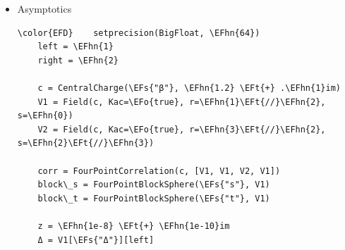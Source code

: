 \documentclass[a4paper]{article}
\numberwithin{equation}{section}
\newcommand{\EFc}[1]{\textcolor{EFc}{#1}} %
\newcommand{\EFcd}[1]{\textcolor{EFcd}{#1}} %
\newcommand{\EFs}[1]{\textcolor{EFs}{#1}} %
\newcommand{\EFt}[1]{\textcolor{EFt}{#1}} %
\newcommand{\EFo}[1]{\textcolor{EFo}{#1}} %
\newcommand{\EFhn}[1]{\textcolor{EFhn}{#1}} %
\begin{document}
\begin{itemize}
\begin{Code}
\begin{Verbatim}
    c = CentralCharge(\EFs{"β"}, big(\EFhn{1.2}\EFt{+}.\EFhn{1}\EFt{*}\EFhn{1}im));
    V1 = Field(c, \EFs{"Δ"}, \EFhn{0.23}\EFt{+}.\EFhn{11}im, diagonal=\EFo{true});
    V2 = Field(c, \EFs{"Δ"}, \EFhn{3.43}, diagonal=\EFo{true});
    V3 = Field(c, \EFs{"Δ"}, \EFhn{0.13}, diagonal=\EFo{true});
    V4 = Field(c, \EFs{"Δ"}, \EFhn{1.3}, diagonal=\EFo{true});
    V = Field(c, \EFs{"Δ"}, \EFhn{0.1}, diagonal = \EFo{true});

    corr = FourPointCorrelation(c, [V1, V2, V3, V4])

    bl\_s = FourPointBlockSphere(\EFs{"s"}, V)
    bl\_t = FourPointBlockSphere(\EFs{"t"}, V)
    bl\_u = FourPointBlockSphere(\EFs{"u"}, V)

    x=\EFhn{0.05}

    \EFcd{\#} \EFc{comparing to values from Sylvain's code}
    \textcolor[HTML]{483d8b}{\textbf{@test}} isapprox(block\_chiral(x, \EFhn{6}, bl\_s, corr, left), \EFhn{2337.4038141240320199350204984981259378760811288542} \EFt{+} \EFhn{4771.3912725970751669197262259253749217475400016186}im, rtol = \EFhn{1e-10})
    \textcolor[HTML]{483d8b}{\textbf{@test}} isapprox(block\_chiral(x, \EFhn{6}, bl\_t, corr, left), \EFhn{52191.790807047848992452669811987274395806031692488} \EFt{-} \EFhn{140430.98553278617162374003412214159828722759436549}im,rtol = \EFhn{1e-10})
    \textcolor[HTML]{483d8b}{\textbf{@test}} isapprox(block\_chiral(x, \EFhn{6}, bl\_u, corr, left), \EFhn{852.92814340196565010929995606986011067184449511918} \EFt{+} \EFhn{359.96303529282323934093142050535102602840290239155}im, rtol = \EFhn{1e-10})
\end{Verbatim}
\end{Code}
\item Asymptotics
\label{sec:org2488c35}

\begin{Code}
\begin{Verbatim}
\color{EFD}    setprecision(BigFloat, \EFhn{64})
    left = \EFhn{1}
    right = \EFhn{2}

    c = CentralCharge(\EFs{"β"}, \EFhn{1.2} \EFt{+} .\EFhn{1}im)
    V1 = Field(c, Kac=\EFo{true}, r=\EFhn{1}\EFt{//}\EFhn{2}, s=\EFhn{0})
    V2 = Field(c, Kac=\EFo{true}, r=\EFhn{3}\EFt{//}\EFhn{2}, s=\EFhn{2}\EFt{//}\EFhn{3})

    corr = FourPointCorrelation(c, [V1, V1, V2, V1])
    block\_s = FourPointBlockSphere(\EFs{"s"}, V1)
    block\_t = FourPointBlockSphere(\EFs{"t"}, V1)

    z = \EFhn{1e-8} \EFt{+} \EFhn{1e-10}im
    Δ = V1[\EFs{"Δ"}][left]


\end{Verbatim}
\end{Code}
\end{itemize}
\end{document}
